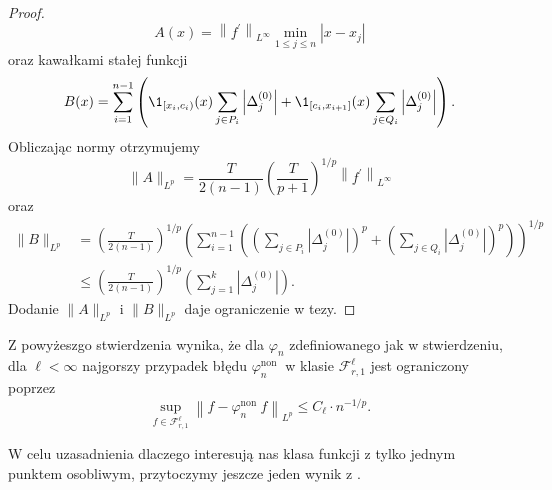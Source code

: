 \documentclass[oik, pdftex, robocza, man]{mgrwms}
\begin{document}
\begin{proof}
        \begin{equation*}
            A(x)=\left\|f^{\prime}\right\|_{L^{\infty}} \min _{1 \leq j \leq n}\left|x-x_{j}\right|
        \end{equation*}
        oraz kawałkami stałej funkcji
        \begin{equation*}
            B(x)=\sum_{i=1}^{n-1}\left(\1_{\left[x_{i}, c_{i}\right)}(x) \sum_{j \in P_{i}}\left|\Delta_{j}^{(0)}\right|+\1_{\left[c_{i}, x_{i+1}\right]}(x) \sum_{j \in Q_{i}}\left|\Delta_{j}^{(0)}\right|\right).
        \end{equation*}
        Obliczając normy otrzymujemy
        \begin{equation*}
            \|A\|_{L^{p}}=\frac{T}{2(n-1)}\left(\frac{T}{p+1}\right)^{1 / p}\left\|f^{\prime}\right\|_{L^{\infty}}            
        \end{equation*}
        oraz
        \begin{equation*}
            \begin{aligned}
                \|B\|_{L^{p}} &=\left(\frac{T}{2(n-1)}\right)^{1 / p}\left(\sum_{i=1}^{n-1}\left(\left(\sum_{j \in P_{i}}\left|\Delta_{j}^{(0)}\right|\right)^{p}+\left(\sum_{j \in Q_{i}}\left|\Delta_{j}^{(0)}\right|\right)^{p}\right)\right)^{1 / p} \\
                              & \leq\left(\frac{T}{2(n-1)}\right)^{1 / p}\left(\sum_{j=1}^{k}\left|\Delta_{j}^{(0)}\right|\right).
            \end{aligned}
        \end{equation*}
        Dodanie $\|A\|_{L^{p}}$ i $\|B\|_{L^{p}}$ daje ograniczenie w tezy.
    \end{proof}
    
    Z powyżeszgo stwierdzenia wynika, że dla $\varphi_{n}$ zdefiniowanego jak w stwierdzeniu, dla $\ell<\infty$ najgorszy przypadek błędu $\varphi_{n}^{\text {non }}$ w klasie $\mathcal{F}_{r, 1}^{\ell}$ jest ograniczony poprzez
    \begin{equation} \label{eq:27}
        \sup _{f \in \mathcal{F}_{r, 1}^{\ell}}\left\|f-\varphi_{n}^{\text {non }} f\right\|_{L^{p}} \leq C_{\ell} \cdot n^{-1 / p}.
    \end{equation}
    
    W celu uzasadnienia dlaczego interesują nas klasa funkcji z tylko jednym punktem osobliwym, przytoczymy jeszcze jeden wynik z \cite{PoA}. 
\end{document}
